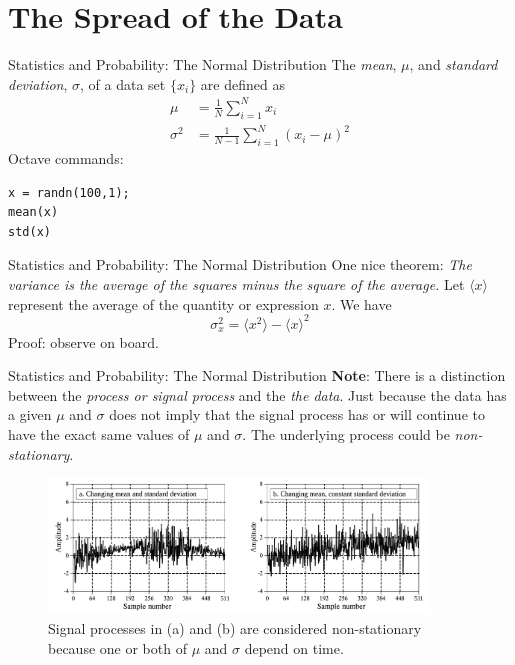\documentclass{beamer}
\begin{document}
\section{The Spread of the Data}

\begin{frame}[fragile]{Statistics and Probability: The Normal Distribution}
The \textit{mean}, $\mu$, and \textit{standard deviation}, $\sigma$, of a data set $\lbrace x_i \rbrace$ are defined as
\begin{align}
\mu &= \frac{1}{N}\sum_{i=1}^N x_i \\
\sigma^2 &= \frac{1}{N-1}\sum_{i=1}^N\left(x_i-\mu\right)^2
\end{align}
Octave commands:
\begin{verbatim}
x = randn(100,1);
mean(x)
std(x)
\end{verbatim}
\end{frame}

\begin{frame}[fragile]{Statistics and Probability: The Normal Distribution}
One nice theorem: \textit{The variance is the average of the squares minus the square of the average.}  Let $\langle x \rangle$ represent the average of the quantity or expression $x$.  We have
\begin{equation}
\sigma_x^2 = \langle x^2 \rangle - \langle x \rangle^2
\end{equation}
Proof: observe on board.
\end{frame}

\begin{frame}[fragile]{Statistics and Probability: The Normal Distribution}
\small
\textbf{Note}: There is a distinction between the \textit{process or signal process} and the \textit{the data}.  Just because the data has a given $\mu$ and $\sigma$ does not imply that the signal process has or will continue to have the exact same values of $\mu$ and $\sigma$.  The underlying process could be \textit{non-stationary}.
\begin{figure}
\centering
\includegraphics[width=0.9\textwidth]{figures/non_stationary.png}
\caption{\label{fig:non_stationary2} Signal processes in (a) and (b) are considered \alert{non-stationary} because one or both of $\mu$ and $\sigma$ depend on time.}
\end{figure}
\end{frame}
\end{document}
